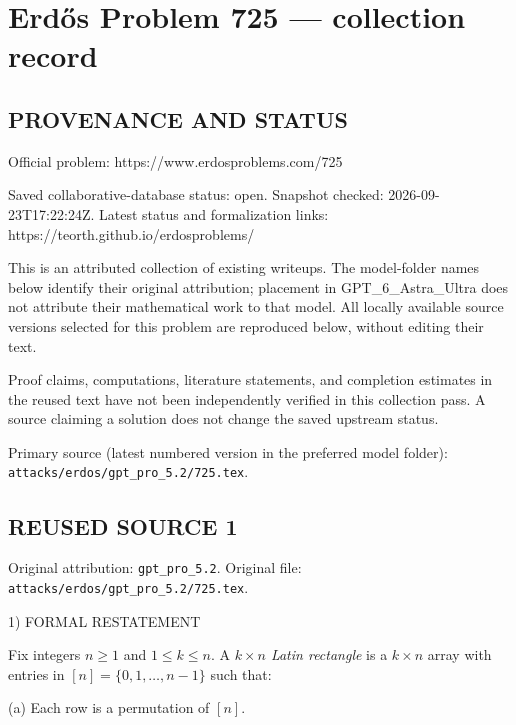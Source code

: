 \section*{Erd\H{o}s Problem 725 --- collection record}

\subsection*{PROVENANCE AND STATUS}
Official problem: https://www.erdosproblems.com/725

Saved collaborative-database status: open.
Snapshot checked: 2026-09-23T17:22:24Z.
Latest status and formalization links: https://teorth.github.io/erdosproblems/

This is an attributed collection of existing writeups. The model-folder names below identify their original attribution; placement in GPT\_6\_Astra\_Ultra does not attribute their mathematical work to that model. All locally available source versions selected for this problem are reproduced below, without editing their text.

Proof claims, computations, literature statements, and completion estimates in the reused text have not been independently verified in this collection pass. A source claiming a solution does not change the saved upstream status.

Primary source (latest numbered version in the preferred model folder): \texttt{attacks/erdos/gpt\_pro\_5.2/725.tex}.

\subsection*{REUSED SOURCE 1}
Original attribution: \texttt{gpt\_pro\_5.2}.
Original file: \texttt{attacks/erdos/gpt\_pro\_5.2/725.tex}.


1) FORMAL RESTATEMENT

Fix integers $n\ge 1$ and $1\le k\le n$.
A \emph{$k\times n$ Latin rectangle} is a $k\times n$ array with entries in $[n]=\{0,1,\dots,n-1\}$ such that:

(a) Each row is a permutation of $[n]$.

